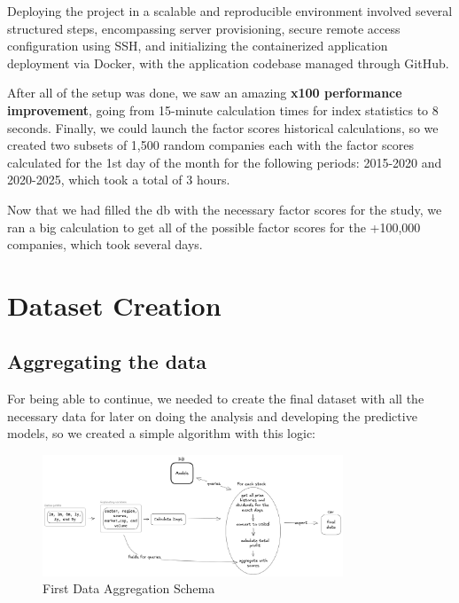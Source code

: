 \documentclass[11pt,english,a4paper,hidelinks]{book}
\begin{document}
\noindent Deploying the project in a scalable and reproducible environment involved several structured steps, encompassing server provisioning, secure remote access configuration using SSH, and initializing the containerized application deployment via Docker, with the application codebase managed through GitHub.

\vspace{0.5cm}  
\noindent After all of the setup was done, we saw an amazing \textbf{x100 performance improvement}, going from 15-minute calculation times for index statistics to 8 seconds. Finally, we could launch the factor scores historical calculations, so we created two subsets of 1,500 random companies each with the factor scores calculated for the 1st day of the month for the following periods: 2015-2020 and 2020-2025, which took a total of 3 hours.

\vspace{0.5cm}
\noindent Now that we had filled the \acrshort{db} with the necessary factor scores for the study, we ran a big calculation to get all of the possible factor scores for the +100,000 companies, which took several days.

\section{Dataset Creation}

\subsection{Aggregating the data}

For being able to continue, we needed to create the final dataset with all the necessary data for later on doing the analysis and developing the predictive models, so we created a simple algorithm with this logic:

\begin{figure}[H]
    \centering
    \includegraphics[width=0.8\textwidth]{images/tweenvest/First Data Aggregation Schema.png}
    \caption{First Data Aggregation Schema}
    \label{fig:first_data_aggregation_schema}
\end{figure}
\end{document}
